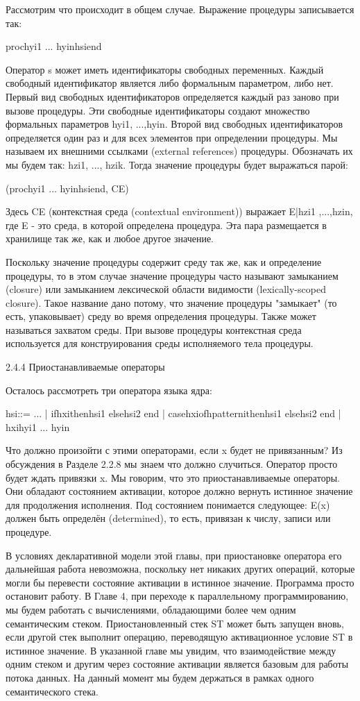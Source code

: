 Рассмотрим что происходит в общем случае. Выражение процедуры записывается так:

proc{hyi1 ... hyin}hsiend

Оператор s может иметь идентификаторы свободных переменных. Каждый свободный идентификатор является либо формальным параметром, либо нет. Первый вид свободных идентификаторов определяется каждый раз заново при вызове процедуры. Эти свободные идентификаторы создают множество формальных параметров {hyi1, ...,hyin}. Второй вид свободных идентификаторов определяется один раз и для всех элементов при определении процедуры. Мы называем их внешними ссылками (external references) процедуры. Обозначать их мы будем так: {hzi1, ..., hzik}. Тогда значение процедуры будет выражаться парой:

(proc{hyi1 ... hyin}hsiend, CE)

Здесь CE (контекстная среда (contextual environment)) выражает E|{hzi1 ,...,hzin}, где E - это среда, в которой определена процедура. Эта пара размещается в хранилище так же, как и любое другое значение.

Поскольку значение процедуры содержит среду так же, как и определение процедуры, то в этом случае значение процедуры часто называют замыканием (closure) или замыканием лексической области видимости (lexically-scoped closure). Такое название дано потому, что значение процедуры "замыкает" (то есть, упаковывает) среду во время определения процедуры. Также может называться захватом среды. При вызове процедуры контекстная среда используется для конструирования среды исполняемого тела процедуры.

2.4.4 Приостанавливаемые операторы

Осталось рассмотреть три оператора языка ядра:

hsi::= ...
| ifhxithenhsi1 elsehsi2 end
| casehxiofhpatternithenhsi1 elsehsi2 end
| {hxihyi1 ... hyin}

Что должно произойти с этими операторами, если x будет не привязанным? Из обсуждения в Разделе 2.2.8 мы знаем что должно случиться. Оператор просто будет ждать привязки x. Мы говорим, что это приостанавливаемые операторы. Они обладают состоянием активации, которое должно вернуть истинное значение для продолжения исполнения. Под состоянием понимается следующее: E(x) должен быть определён (determined), то есть, привязан к числу, записи или процедуре.

В условиях декларативной модели этой главы, при приостановке оператора его дальнейшая работа невозможна, поскольку нет никаких других операций, которые могли бы перевести состояние активации в истинное значение. Программа просто остановит работу. В Главе 4, при переходе к параллельному программированию, мы будем работать с вычислениями, обладающими более чем одним семантическим стеком. Приостановленный стек ST может быть запущен вновь, если другой стек выполнит операцию, переводящую активационное условие ST в истинное значение. В указанной главе мы увидим, что взаимодействие между одним стеком и другим через состояние активации является базовым для работы потока данных. На данный момент мы будем держаться в рамках одного семантического стека.

